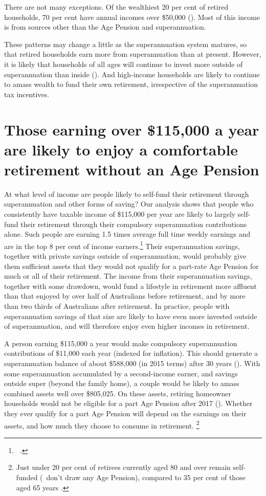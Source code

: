 There are not many exceptions. Of the wealthiest 20 per cent of retired households, 70 per cent have annual incomes over \$50,000 (). Most of this income is from sources other than the Age Pension and superannuation. 

These patterns may change a little as the superannuation system matures, so that retired households earn more from superannuation than at present. However, it is likely that households of all ages will continue to invest more outside of superannuation than inside (). And high-income households are likely to continue to amass wealth to fund their own retirement, irrespective of the superannuation tax incentives.

\section{Those earning over \$115,000 a year are likely to enjoy a comfortable retirement without an Age Pension}\label{sec:SUPER-3-3}
At what level of income are people likely to self-fund their retirement through superannuation and other forms of saving? Our analysis shows that people who consistently have taxable income of \$115,000 per year are likely to largely self-fund their retirement through their compulsory superannuation contributions alone. Such people are earning 1.5 times average full time weekly earnings and are in the top 8 per cent of income earners.\footnote{\gao\ \textcites{ATO2015SampleFile1213}{ABS2013AWE}.} Their superannuation savings, together with private savings outside of superannuation, would probably give them sufficient assets that they would not qualify for a part-rate Age Pension for much or all of their retirement. The income from their superannuation savings, together with some drawdown, would fund a lifestyle in retirement more affluent than that enjoyed by over half of Australians before retirement, and by more than two thirds of Australians after retirement. In practice, people with superannuation savings of that size are likely to have even more invested outside of superannuation, and will therefore enjoy even higher incomes in retirement.

A person earning \$115,000 a year would make compulsory superannuation contributions of \$11,000 each year (indexed for inflation). This should generate a superannuation balance of about \$588,000 (in 2015 terms\DEVIATION{}) after 30 years (). With some superannuation accumulated by a second-income earner, and savings outside super (beyond the family home), a couple would be likely to amass combined assets well over \$805,025. On these assets, retiring homeowner households would not be eligible for a part Age Pension after 2017 (). Whether they ever qualify for a part Age Pension will depend on the earnings on their assets, and how much they choose to consume in retirement.%
\footnote{Just under 20 per cent of retirees currently aged 80 and over remain self-funded (\ie~don’t draw any Age Pension), compared to 35 per cent of those aged 65 years 
\textcite[][47]{ActuariesInstitute2015RetirementIncomes}.} 

